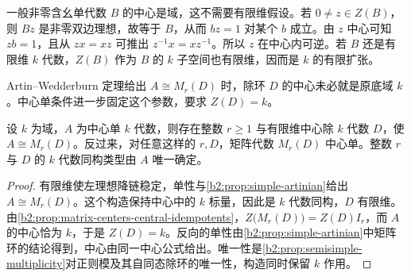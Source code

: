 \ProseParagraphBreak
一般非零含幺单代数 \(B\) 的中心是域，这不需要有限维假设。若 \(0\ne z\in Z(B)\)，则 \(Bz\) 是非零双边理想，故等于 \(B\)，从而 \(bz=1\) 对某个 \(b\) 成立。由 \(z\) 中心可知 \(zb=1\)，且从 \(zx=xz\) 可推出 \(z^{-1}x=xz^{-1}\)。所以 \(z\) 在中心内可逆。若 \(B\) 还是有限维 \(k\) 代数，\(Z(B)\) 作为 \(B\) 的 \(k\) 子空间也有限维，因而是 \(k\) 的有限扩张。

\ProseParagraphBreak
Artin–Wedderburn 定理给出 \(A\cong M_r(D)\) 时，除环 \(D\) 的中心未必就是原底域 \(k\)。中心单条件进一步固定这个参数，要求 \(Z(D)=k\)。

\begin{proposition}\label{b2:prop:csa-division-description}
	设 \(k\) 为域，\(A\) 为中心单 \(k\) 代数，则存在整数 \(r\geq1\) 与有限维中心除 \(k\) 代数 \(D\)，使 \(A\cong M_r(D)\)。反过来，对任意这样的 \(r,D\)，矩阵代数 \(M_r(D)\) 中心单。整数 \(r\) 与 \(D\) 的 \(k\) 代数同构类型由 \(A\) 唯一确定。
\end{proposition}
\begin{proof}
	有限维使左理想降链稳定，单性与\cref{b2:prop:simple-artinian}给出 \(A\cong M_r(D)\)。这个构造保持中心中的 \(k\) 标量，因此是 \(k\) 代数同构，\(D\) 有限维。由\cref{b2:prop:matrix-centers-central-idempotents}，\(Z\bigl(M_r(D)\bigr)=Z(D)I_r\)，而 \(A\) 的中心恰为 \(k\)，于是 \(Z(D)=k\)。反向的单性由\cref{b2:prop:simple-artinian}中矩阵环的结论得到，中心由同一中心公式给出。唯一性是\cref{b2:prop:semisimple-multiplicity}对正则模及其自同态除环的唯一性，构造同时保留 \(k\) 作用。
\end{proof}

